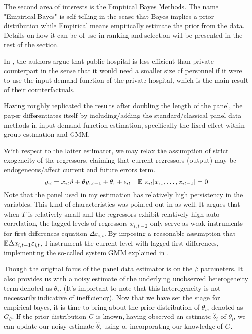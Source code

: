 \documentclass[12pt]{article}
\begin{document}
The second area of interests is the Empirical Bayes Methods. The name
"Empirical Bayes" is self-telling in the sense that Bayes implies a prior
distribution while Empirical means empirically estimate the prior from the
data. Details on how it can be of use in ranking and selection will be
presented in the rest of the section.

In \cite{croiset2024hospitals}, the authors argue that public hospital is less
efficient than private counterpart in the sense that it would need a smaller
size of personnel if it were to use the input demand function of the private
hospital, which is the main result of their counterfactuals.

Having roughly replicated the results after doubling the length of the panel,
the paper differentiates itself by including/adding the standard/classical
panel data methods in input demand function estimation, specifically the
fixed-effect within-group estimation and GMM.

With respect to the latter estimator, we may relax the assumption of strict
exogeneity of the regressors, claiming that current regressors (output) may be
endogeneous/affect current and future errors term.
\begin{equation*}
    y_{it}  = x_{it} \beta + \theta y_{i,t-1}+\theta_i + \varepsilon_{it} \quad  \mathbb{E}\left[\varepsilon_{it}|x_{i1},\ldots,x_{it-1}\right] =0
\end{equation*}
Note that the panel used in my estimation has relatively high persistency in the variables. This kind of characteristics was pointed out in \cite{blundell1998initial} as well. It argues that when $T$ is relatively small and the regressors exhibit relatively high auto correlation, the lagged levels of regressors $x_{i,t-2}$ only serve as weak instruments for first differences equation $\Delta \varepsilon_{i,t}$. By imposing a reasonable assumption that $\mathbb{E}{\Delta x_{i,t-1}\varepsilon_{i,t}}$, I instrument the current level with lagged first differences, implementing the so-called system GMM explained in \cite{arellano1995another,blundell1998initial}.

Though the original focus of the panel data estimator is on the $\beta$
parameters. It also provides us with a noisy estimate of the underlying
unobserved heterogeneity term denoted as $\theta_i$. (It's important to note
that this heterogeneity is not necessarily indicative of inefficiency). Now
that we have set the stage for empirical bayes, it is time to bring about the
prior distribution of $\theta_i$, denoted as $G_{\theta}$. If the prior
distribution $G$ is known, having observed an estimate $\hat{\theta}_i$ of
$\theta_i$, we can update our noisy estimate $\hat{\theta}_i$ using or
incorporating our knowledge of $G$.
\end{document}
